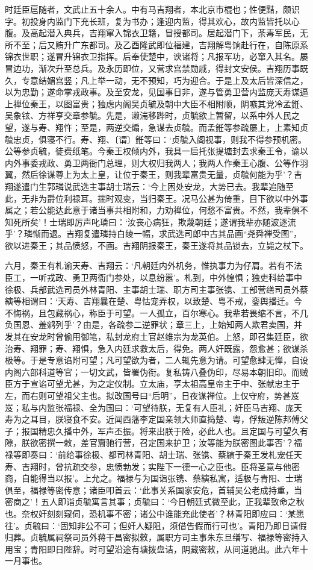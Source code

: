 \documentclass[]{article}
\begin{document}
时廷臣扈随者，文武止五十余人。中有马吉翔者，本北京市棍也；性便黠，颇识字。初投身内监门下充长班，复为书办；逢迎内监，得其欢心，故内监皆托以心腹。及高起潜入典兵，吉翔窜入锦衣卫籍，冒授都司。居起潜门下，荼毒军民，无所不至；后又贿升广东都司。及乙酉隆武即位福建，吉翔解粤饷赴行在，自陈原系锦衣世职；遂冒升锦衣卫指挥。后奉使楚中，谀诸将；凡报军功，必窜入其名。屡冒边功，渐次升至总兵。及永历即位，又营求宫禁勋戚，得封文安侯。吉翔历事既久，专意结媚宫竖；凡上举一动，无不预知，巧为迎合。于是上及太后皆深信之，以为忠勤；遂命掌戎政事。及至安龙，见国事日非，遂与管勇卫营内监庞天寿谋逼上禅位秦王，以图富贵；独虑内阁吴贞毓及朝中大臣不相附顺，阴嗾其党冷孟銋、吴象铉、方祥亨交章参毓。先是，濑湍移跸时，贞毓欲上暂留，以系中外人民之望，遂与寿、翔忤；至是，两逆交煽，急谋去贞毓。而孟銋等参疏屡上，上素知贞毓忠贞，俱寝不行。寿、翔、〔谓〕銋等曰：`贞毓入阁视事，则我不得参预机密。公等参贞毓，徒费纸笔。今秦王权倾内外，我具一启托张提塘封去求秦王令，谕以内外事委戎政、勇卫两衙门总理，则大权归我两人；我两人作秦王心腹、公等作羽翼，然后徐谋尊上为太上皇，让位于秦王，则我辈富贵无量，贞毓何能为乎'？吉翔遂遣门生郭璘说武选主事胡士瑞云：`今上困处安龙，大势已去。我辈追随至此，无非为爵位利禄耳。揣时观变，当归秦王。况马公甚为倚重，目下欲以中外事属之；若公能达此意于诸当事共相附和，力劝禅位，何愁不富贵。不然，我辈俱不知死所矣'！士瑞即厉声叱璘曰：`汝丧心病狂，欺蔑朝廷；遂谓我辈亦随波逐流乎'？璘惭而退。吉翔复遣璘持白绫一幅，求武选司郎中古其品画``尧舜禅受图''，欲以进秦王；其品愤怒，不画。吉翔阴报秦王，秦王遂将其品锁去，立毙之杖下。

六月，秦王有札谕天寿、吉翔云：`凡朝廷内外机务，惟执事力为仔肩。若有不法臣工，一听戎政、勇卫两衙门参处，以息纷嚣'。札到，中外惶惧；独吏科给事中徐极、兵部武选司员外林青阳、主事胡士瑞、职方司主事张镌、工部营缮司员外蔡縯等相谓曰：`天寿、吉翔曩在楚、粤怙宠弄权，以致楚、粤不戒，銮舆播迁。今不悔祸，且包藏祸心，称臣于可望。一人孤立，百尔寒心。我辈若畏缩不言，不几负国恩、羞鹓列乎'？由是，各疏参二逆罪状；章三上，上始知两人欺君卖国，并发其在安龙时曾偷用御笔，私封龙府土官赵维宗为龙英伯。上怒，即召集廷臣，欲治寿、翔罪；寿、翔惧，急入内廷求救太后，得免。两人奸既露，怨愈甚；欲谋杀极等。于是专意谄附可望；凡可望欲为者，二人辄先意为请。可望愈肆无惮，自设内阁六部科道等官；一切文武，皆署伪衔。复私铸八叠伪印，尽易本朝旧印。而贼臣方于宣谄可望尤甚，为之定仪制。立太庙，享太祖高皇帝主于中、张献忠主于左，而右则可望祖父主也。拟改国号曰``后明''，日夜谋禅位。上仅守府，势甚岌岌；私与内监张福禄、全为国曰：`可望待朕，无复有人臣礼；奸臣马吉翔、庞天寿为之耳目，朕寝食不安。近闻西藩李定国亲领大师直捣楚、粤，俘叛逆陈邦傅父子；报国精忠久播中外，军声丕振。将来出朕于险，必此人也。且定国与可望久有隙，朕欲密撰一敕，差官齎驰行营，召定国来护卫；汝等能为朕密图此事否'？福禄等即奏曰：`前给事徐极、都司林青阳、胡士瑞、张镌、蔡縯于秦王发札宠任天寿、吉翔时，曾抗疏交参，忠愤勃发；实陛下一德一心之臣也。臣将圣意与他密商，自能得当以报'。上允之。福禄与为国诣张镌、蔡縯私寓，适极与青阳、士瑞俱至，福禄等密传意；诸臣叩首云：`此事关系国家安危，首辅吴公老成持重，当密商之'！五人即诣贞毓寓言其事；贞毓曰：`今日朝廷式微至此，正我辈致命之秋也。奈权奸刻刻窥伺，恐机事不密；诸公中谁能充此使者'？林青阳即应曰：`某愿往'。贞毓曰：`固知非公不可；但奸人疑阻，须借告假而行可也'。青阳乃即日请假归葬。贞毓属祠祭司员外蒋干昌密拟敕，属职方司主事朱东旦缮写、福禄等密持入用宝；青阳即日陛辞。时可望沿途有塘拨盘诘，阴藏密敕，从间道驰出。此六年十一月事也。
\end{document}
